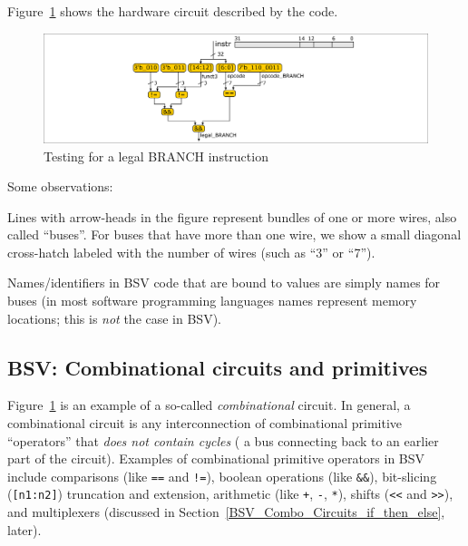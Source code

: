 Figure~\ref{Fig_Combo_Is_Legal_BRANCH} shows the hardware circuit described by the code.
\begin{figure}[htbp]
  \centerline{\includegraphics[width=6in,angle=0]{ch040_Combo_Circuits/Figures/Fig_Combo_Is_Legal_BRANCH}}
  \caption{\label{Fig_Combo_Is_Legal_BRANCH}Testing for a legal BRANCH instruction}
\end{figure}
Some observations:
\begin{tightlist}

 \item Lines with arrow-heads in the figure represent bundles of one
   or more wires, also called ``buses''.  For buses that have more
   than one wire, we show a small diagonal cross-hatch labeled with
   the number of wires (such as ``3'' or ``7'').

 \item Names/identifiers in BSV code that are bound to values are
   simply names for buses (in most software programming languages
   names represent memory locations; this is \emph{not} the case in
   BSV).

\end{tightlist}


\subsection{BSV: Combinational circuits and primitives}


Figure~\ref{Fig_Combo_Is_Legal_BRANCH} is an example of a so-called
\emph{combinational} circuit.  In general, a combinational circuit is
any interconnection of combinational primitive ``operators'' that
\emph{does not contain cycles} ({\ie} a bus connecting back to an
earlier part of the circuit).  Examples of combinational primitive
operators in BSV include comparisons (like \verb|==| and \verb|!=|),
boolean operations (like \verb|&&|), bit-slicing (\verb|[n1:n2]|)
truncation and extension, arithmetic (like \verb|+|, \verb|-|,
\verb|*|), shifts (\verb|<<| and \verb|>>|), and multiplexers
(discussed in Section~\ref{BSV_Combo_Circuits_if_then_else}, later).

